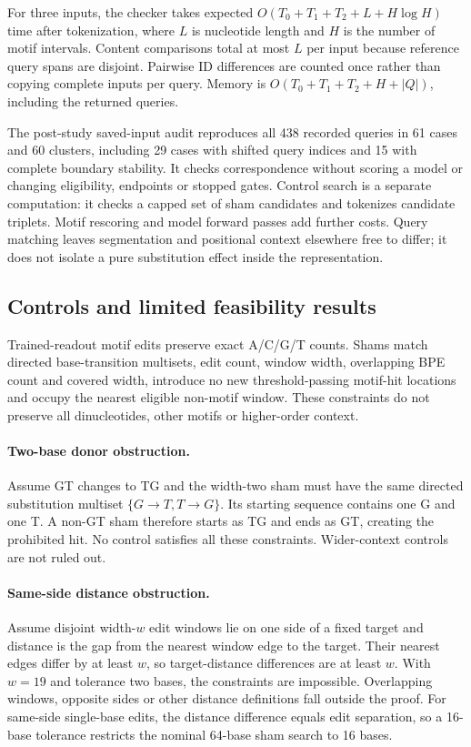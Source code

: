 \documentclass[unnumsec,webpdf,modern,large,namedate]{oup-authoring-template}
\begin{document}
For three inputs, the checker takes expected $O(T_0+T_1+T_2+L+H\log H)$ time after tokenization, where $L$ is nucleotide length and $H$ is the number of motif intervals. Content comparisons total at most $L$ per input because reference query spans are disjoint. Pairwise ID differences are counted once rather than copying complete inputs per query. Memory is $O(T_0+T_1+T_2+H+|Q|)$, including the returned queries.

The post-study saved-input audit reproduces all 438 recorded queries in 61 cases and 60 clusters, including 29 cases with shifted query indices and 15 with complete boundary stability. It checks correspondence without scoring a model or changing eligibility, endpoints or stopped gates. Control search is a separate computation: it checks a capped set of sham candidates and tokenizes candidate triplets. Motif rescoring and model forward passes add further costs. Query matching leaves segmentation and positional context elsewhere free to differ; it does not isolate a pure substitution effect inside the representation.
\subsection{Controls and limited feasibility results}
Trained-readout motif edits preserve exact A/C/G/T counts. Shams match directed base-transition multisets, edit count, window width, overlapping BPE count and covered width, introduce no new threshold-passing motif-hit locations and occupy the nearest eligible non-motif window. These constraints do not preserve all dinucleotides, other motifs or higher-order context.

\paragraph{Two-base donor obstruction.}
Assume GT changes to TG and the width-two sham must have the same directed substitution multiset $\{G\!\to\!T,T\!\to\!G\}$. Its starting sequence contains one G and one T. A non-GT sham therefore starts as TG and ends as GT, creating the prohibited hit. No control satisfies all these constraints. Wider-context controls are not ruled out.

\paragraph{Same-side distance obstruction.}
Assume disjoint width-$w$ edit windows lie on one side of a fixed target and distance is the gap from the nearest window edge to the target. Their nearest edges differ by at least $w$, so target-distance differences are at least $w$. With $w=19$ and tolerance two bases, the constraints are impossible. Overlapping windows, opposite sides or other distance definitions fall outside the proof. For same-side single-base edits, the distance difference equals edit separation, so a 16-base tolerance restricts the nominal 64-base sham search to 16 bases.
\end{document}
